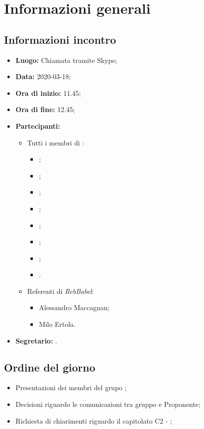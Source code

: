\section{Informazioni generali}
\subsection{Informazioni incontro}
\begin{itemize}
	\item \textbf{Luogo:} Chiamata tramite Skype;
	\item \textbf{Data:} 2020-03-18;
	\item \textbf{Ora di inizio:} 11.45;
	\item \textbf{Ora di fine:} 12.45;
	\item \textbf{Partecipanti:}
		\begin{itemize}
			\item Tutti i membri di \Gruppo:
			\begin{itemize}
				\item \VB;
				\item \LB;
				\item \NF;
				\item \EG;
				\item \FJ;
				\item \MP;
				\item \AS;
				\item \AZ.
			\end{itemize}
		\end{itemize}
		\begin{itemize}
			\item Referenti di \textit{RebBabel}:
			\begin{itemize}
				\item Alessandro Maccagnan;
				\item Milo Ertola.
			\end{itemize}
		\end{itemize}

	\item \textbf{Segretario:} \VB.
\end{itemize}

\subsection{Ordine del giorno}
\begin{itemize}
	\item Presentazioni dei membri del grupo \Gruppo;
	\item Decisioni riguardo le comunicazioni tra gruppo e Proponente;
	\item Richiesta di chiarimenti riguardo il capitolato C2 - \NomeProgetto;
\end{itemize}
